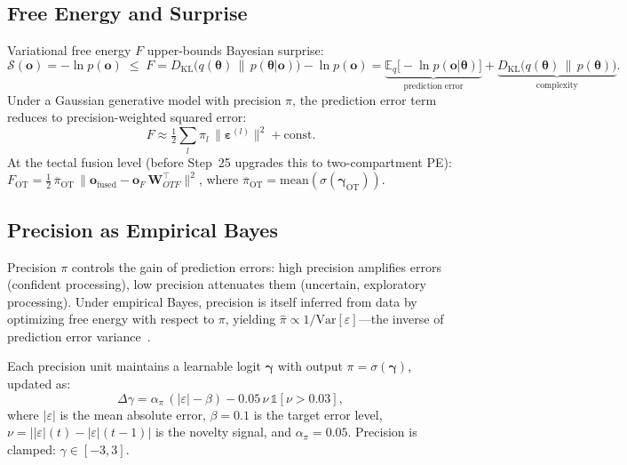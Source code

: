 \documentclass[11pt,a4paper]{article}
\begin{document}
\subsection{Free Energy and Surprise}

Variational free energy $F$ upper-bounds Bayesian surprise:
\begin{equation}\label{eq:surprise_bound}
  \mathcal{S}(\mathbf{o}) = -\ln p(\mathbf{o}) \;\leq\; F
    = D_\text{KL}\!\bigl(q(\boldsymbol{\theta})\,\|\,p(\boldsymbol{\theta}|\mathbf{o})\bigr)
    - \ln p(\mathbf{o})
    = \underbrace{\mathbb{E}_q\bigl[-\ln p(\mathbf{o}|\boldsymbol{\theta})\bigr]}_{\text{prediction error}}
    + \underbrace{D_\text{KL}\!\bigl(q(\boldsymbol{\theta})\,\|\,p(\boldsymbol{\theta})\bigr)}_{\text{complexity}}.
\end{equation}
Under a Gaussian generative model with precision $\pi$, the prediction error
term reduces to precision-weighted squared error:
\begin{equation}\label{eq:freeenergy}
  F \approx \tfrac{1}{2}\sum_l \pi_l\,
      \bigl\|\boldsymbol{\varepsilon}^{(l)}\bigr\|^2
    + \text{const.}
\end{equation}
At the tectal fusion level (before Step~25 upgrades this to two-compartment PE):
$F_\text{OT} = \tfrac{1}{2}\,\overline{\pi}_\text{OT}\,
\|\mathbf{o}_\text{fused} - \mathbf{o}_F\,\mathbf{W}_{OTF}^\top\|^2$,
where $\overline{\pi}_\text{OT} = \text{mean}(\sigma(\boldsymbol{\gamma}_\text{OT}))$.

\subsection{Precision as Empirical Bayes}

Precision $\pi$ controls the gain of prediction errors: high precision
amplifies errors (confident processing), low precision attenuates them
(uncertain, exploratory processing).
Under empirical Bayes, precision is itself inferred from data by
optimizing free energy with respect to $\pi$, yielding
$\hat{\pi} \propto 1/\text{Var}[\varepsilon]$---the inverse of prediction
error variance~\cite{feldman2010}.

Each precision unit maintains a learnable logit $\boldsymbol{\gamma}$ with
output $\pi = \sigma(\boldsymbol{\gamma})$, updated as:
\begin{equation}\label{eq:precision}
  \Delta\gamma = \alpha_\pi\,(|\varepsilon| - \beta)
    - 0.05\,\nu\,\mathbb{1}[\nu > 0.03],
\end{equation}
where $|\varepsilon|$ is the mean absolute error, $\beta = 0.1$ is the target
error level, $\nu = ||\varepsilon|(t) - |\varepsilon|(t{-}1)|$ is the novelty
signal, and $\alpha_\pi = 0.05$.
Precision is clamped: $\gamma \in [-3, 3]$.
\end{document}
